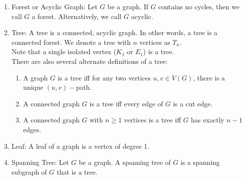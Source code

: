 \documentclass{article}
\begin{document}
\begin{enumerate}
		\item Forest or Acyclic Graph: Let $G$ be a graph.
		If $G$ contains no cycles, then we call $G$ a forest.
		Alternatively, we call $G$ acyclic.
		
		\item Tree: A tree is a connected, acyclic graph.
		In other words, a tree is a connected forest.
		We denote a tree with $n$ vertices as $T_n$.\\
		
		Note that a single isolated vertex ($K_1$ or $E_1$) is a tree.\\
		
		There are also several alternate definitions of a tree:
		
		\begin{enumerate}
			\item A graph $G$ is a tree iff for any two vertices $u,v\in V(G)$, there is a unique $(u,v)-$path.
			\item A connected graph $G$ is a tree iff every edge of $G$ is a cut edge.
			\item A connected graph $G$ with $n\geq 1$ vertices is a tree iff $G$ has exactly $n-1$ edges.
		\end{enumerate}
		
		\item Leaf: A leaf of a graph is a vertex of degree 1.
		
		\item Spanning Tree: Let $G$ be a graph.
		A spanning tree of $G$ is a spanning subgraph of $G$ that is a tree.
	
	\end{enumerate}
\end{document}

